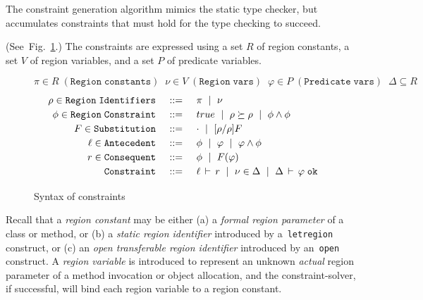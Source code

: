 \documentclass[a4paper,UKenglish]{lipics-v2018}
\newcommand{\C}[1]{\code{#1}}
\newcommand{\code}[1]{\,{\tt #1}\,}
\newcommand{\conj}{\wedge}
\newcommand{\ALT}{~\mid~}
\newcommand{\tywf}[2]{#1\,\vdash\,#2 \; \texttt{ok}}
\newcommand{\isvalid}[2]{#1\,\vdash\,#2}
\newcommand{\outlives}{\succeq}
\newcommand{\coloneqq}{::=}
\newcommand{\regionConstants}{R}
\newcommand{\regionVars}{V}
\newcommand{\predVars}{P}
\begin{document}
The constraint generation algorithm mimics the static type checker,
but accumulates constraints that must hold for the type checking to
succeed.

(See~Fig.~\ref{fig:constraint-syntax}.) The constraints are expressed
using a set $\regionConstants$ of region constants, a set
$\regionVars$ of region variables, and a set $\predVars$ of predicate
variables.

\begin{figure}[!t]

\[
   \pi \in R \; \mathtt{ (Region \; constants) } \;\;
   \nu \in V \; \mathtt{ (Region \; vars) } \;\;
   \varphi \in P \; \mathtt{ (Predicate \; vars) } \;\;
   \Delta \subseteq R
\]
\[
\renewcommand{\arraystretch}{1.2}
\setlength{\arraycolsep}{7pt}
\begin{array}{rcl} 

\rho \in \mathtt{Region \; Identifiers} & \coloneqq & \pi \ALT \nu \\

\phi \in \mathtt{Region \; Constraint} & \coloneqq & true \ALT \rho \outlives \rho \ALT \phi \conj \phi \\

F \in \mathtt{Substitution} & \coloneqq & \cdot \ALT [\rho/\rho]F \\

\ell \in \mathtt{Antecedent} & \coloneqq & \phi \ALT \varphi \ALT \varphi \conj \phi \\

r \in \mathtt{Consequent} & \coloneqq & \phi \ALT F(\varphi) \\

\mathtt{Constraint} & \coloneqq & \isvalid{\ell}{r} \ALT \nu \in \Delta \ALT \tywf{\Delta}{\varphi} \\

\end{array}
\]

\caption{Syntax of constraints}
\label{fig:constraint-syntax}
\end{figure}


Recall that a \emph{region constant} may be either (a) a \emph{formal
region parameter} of a class or method, or (b) a \emph{static region
identifier} introduced by a \C{letregion} construct, or (c) an
\emph{open transferable region identifier} introduced by an \C{open}
construct.  A \emph{region variable} is introduced to represent an
unknown \emph{actual} region parameter of a method invocation or
object allocation, and the constraint-solver, if successful, will bind
each region variable to a region constant.
\end{document}
